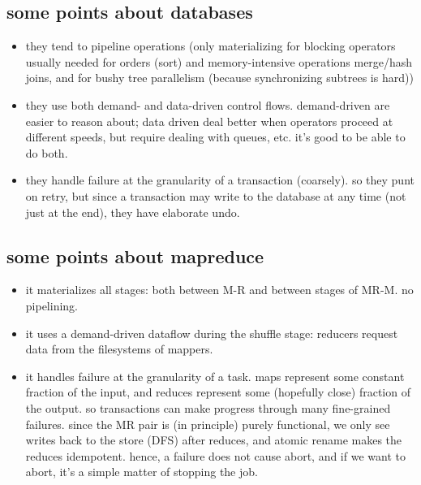 \subsection{some points about databases}
\begin{itemize}

\item they tend to pipeline operations (only materializing for blocking operators usually needed for orders (sort) and memory-intensive operations merge/hash joins, and for bushy tree parallelism (because synchronizing subtrees is hard))

\item they use both demand- and data-driven control flows.  demand-driven are easier to reason about; data driven deal better when operators proceed at different speeds, but require dealing with queues, etc.  it's good to be able to do both.
\item they handle failure at the granularity of a transaction (coarsely).  so they punt on retry, but since a transaction may write to the database at any time (not just at the end), they have elaborate undo.
\end{itemize}

\subsection{some points about mapreduce}
\begin{itemize}
\item it materializes all stages: both between M-R and between stages of MR-M.  no pipelining.

\item it uses a demand-driven dataflow during the shuffle stage: reducers request data from the filesystems of mappers.

\item it handles failure at the granularity of a task.  maps represent some constant fraction of the input, and reduces represent some (hopefully close) fraction of the output.  so transactions can make progress through many fine-grained failures.  since the MR pair is (in principle) purely functional, we only see writes back to the store (DFS) after reduces, and atomic rename makes the reduces idempotent.  hence, a failure does not cause abort, and if we want to abort, it's a simple matter of stopping the job.
\end{itemize}

